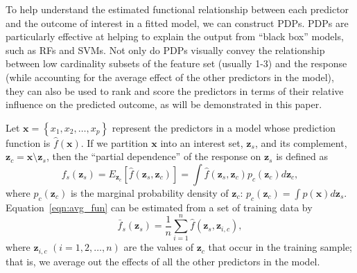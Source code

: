 \documentclass[12pt]{article}
\begin{document}
To help understand the estimated functional relationship between each predictor and the outcome of interest in a fitted model, we can construct PDPs. PDPs are particularly effective at helping to explain the output from ``black box'' models, such as RFs and SVMs. Not only do PDPs visually convey the relationship between low cardinality subsets of the feature set (usually 1-3) and the response (while accounting for the average effect of the other predictors in the model), they can also be used to rank and score the predictors in terms of their relative influence on the predicted outcome, as will be demonstrated in this paper. 

Let $\boldsymbol{x} = \left\{x_1, x_2, \dots, x_p\right\}$ represent the predictors in a model whose prediction function is $\widehat{f}\left(\boldsymbol{x}\right)$. If we partition $\boldsymbol{x}$ into an interest set, $\boldsymbol{z}_s$, and its complement, $\boldsymbol{z}_c = \boldsymbol{x} \setminus \boldsymbol{z}_s$, then the ``partial dependence'' of the response on $\boldsymbol{z}_s$ is defined as
\begin{equation}
\label{eqn:avg_fun}
  f_s\left(\boldsymbol{z}_s\right) = E_{\boldsymbol{z}_c}\left[\widehat{f}\left(\boldsymbol{z}_s, \boldsymbol{z}_c\right)\right] = \int \widehat{f}\left(\boldsymbol{z}_s, \boldsymbol{z}_c\right)p_{c}\left(\boldsymbol{z}_c\right)d\boldsymbol{z}_c,
\end{equation}
where $p_{c}\left(\boldsymbol{z}_c\right)$ is the marginal probability density of $\boldsymbol{z}_c$: $p_{c}\left(\boldsymbol{z}_c\right) = \int p\left(\boldsymbol{x}\right)d\boldsymbol{z}_s$.
Equation~\eqref{eqn:avg_fun} can be estimated from a set of training data by
\begin{equation}
\label{eqn:pdf}
\bar{f}_s\left(\boldsymbol{z}_s\right) = \frac{1}{n}\sum_{i = 1}^n\widehat{f}\left(\boldsymbol{z}_s,\boldsymbol{z}_{i, c}\right),
\end{equation}
where $\boldsymbol{z}_{i, c}$ $\left(i = 1, 2, \dots, n\right)$ are the values of $\boldsymbol{z}_c$ that occur in the training sample; that is, we average out the effects of all the other predictors in the model.
\end{document}
